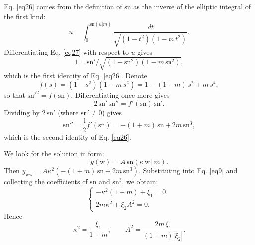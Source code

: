 \documentclass{article}
\begin{document}
    Eq. \ref{eq26} comes from the definition of \(\mathrm{sn}\) as the inverse of the elliptic integral of the first kind:
    \begin{equation} \label{eq27}
        u = \int_{0}^{\mathrm{sn}(u|m)} \frac{dt}{\sqrt{\left(1-t^{2}\right)\left(1-m\,t^{2}\right)}}.
    \end{equation}
    Differentiating Eq. \ref{eq27} with respect to \(u\) gives
    \begin{equation}
        1 = \mathrm{sn}'\big/\sqrt{\left(1-\mathrm{sn}^{2}\right)\left(1-m\,\mathrm{sn}^{2}\right)},
    \end{equation}
    which is the first identity of Eq. \ref{eq26}.
    Denote
    \begin{equation}
        f(s) = \left(1-s^{2}\right)\left(1-m\,s^{2}\right) = 1-(1+m)\,s^{2}+m\,s^{4},
    \end{equation}
    so that \(\mathrm{sn}'^{2} = f(\mathrm{sn})\). Differentiating once more gives
    \begin{equation}
        2\,\mathrm{sn}'\,\mathrm{sn}'' = f'(\mathrm{sn})\,\mathrm{sn}'.
    \end{equation}
    Dividing by \(2\,\mathrm{sn}'\) (where \(\mathrm{sn}'\neq 0\)) gives
    \begin{equation}
        \mathrm{sn}'' = \frac{1}{2}f'(\mathrm{sn}) = -(1+m)\,\mathrm{sn} + 2m\,\mathrm{sn}^{3},
    \end{equation}
    which is the second identity of Eq. \ref{eq26}.

    We look for the solution in form:
    \begin{equation} \label{eq32}
        y\left(\mathrm{w}\right) = A\,\mathrm{sn}\left(\kappa\,\mathrm{w}\,|\,m\right).
    \end{equation}
    Then \(y_{\mathrm{ww}} = A\kappa^{2}\left(-(1+m)\,\mathrm{sn} + 2m\,\mathrm{sn}^{3}\right)\). Substituting into Eq. \ref{eq9} and collecting the coefficients of \(\mathrm{sn}\) and \(\mathrm{sn}^{3}\), we obtain:
    \begin{equation} \label{eq33}
        \begin{cases}
            \displaystyle -\kappa^{2}\left(1+m\right) + \xi_{1} = 0,\\
            \displaystyle 2m\kappa^{2} + \xi_{2}A^{2} = 0.
        \end{cases}
    \end{equation}
    Hence
    \begin{equation} \label{eq34}
        \kappa^{2} = \frac{\xi_{1}}{1+m}, \qquad A^{2} = \frac{2m\,\xi_{1}}{\left(1+m\right)\left|\xi_{2}\right|}.
    \end{equation}
\end{document}
